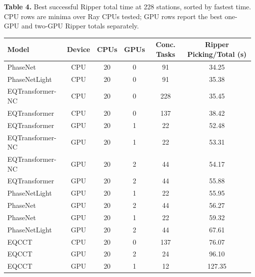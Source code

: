 \clearpage
\begin{landscape}

\begin{center}
\textbf{Table 4.} Best successful Ripper total time at 228 stations, sorted by fastest time. CPU rows are minima over Ray CPUs tested; GPU rows report the best one-GPU and two-GPU Ripper totals separately.

\vspace{0.8em}
\small
\begin{tabular}{lccccc}
\toprule
\textbf{Model} & \textbf{Device} & \textbf{CPUs} & \textbf{GPUs} & \textbf{Conc. Tasks} & \textbf{Ripper Picking/Total (s)} \\
\midrule
PhaseNet         & CPU & 20 & 0 & 91  & 34.25 \\
PhaseNetLight    & CPU & 20 & 0 & 91  & 35.38 \\
EQTransformer-NC & CPU & 20 & 0 & 228 & 35.45 \\
EQTransformer    & CPU & 20 & 0 & 137 & 38.42 \\
EQTransformer    & GPU & 20 & 1 & 22  & 52.48 \\
EQTransformer-NC & GPU & 20 & 1 & 22  & 53.31 \\
EQTransformer-NC & GPU & 20 & 2 & 44  & 54.17 \\
EQTransformer    & GPU & 20 & 2 & 44  & 55.88 \\
PhaseNetLight    & GPU & 20 & 1 & 22  & 55.95 \\
PhaseNet         & GPU & 20 & 2 & 44  & 56.27 \\
PhaseNet         & GPU & 20 & 1 & 22  & 59.32 \\
PhaseNetLight    & GPU & 20 & 2 & 44  & 67.61 \\
EQCCT            & CPU & 20 & 0 & 137 & 76.07 \\
EQCCT            & GPU & 20 & 2 & 24  & 96.10 \\
EQCCT            & GPU & 20 & 1 & 12  & 127.35 \\
\bottomrule
\end{tabular}
\end{center}

\end{landscape}

